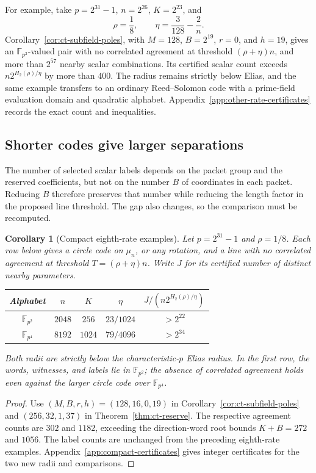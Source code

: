\documentclass[11pt,letterpaper]{article}
\newtheorem{corollary}[theorem]{Corollary}
\theoremstyle{definition}
\theoremstyle{remark}
\newcommand{\F}{\mathbb F}
\begin{document}
For example, take $p=2^{31}-1$, $n=2^{26}$, $K=2^{23}$, and
\[
 \rho=\frac18,\qquad \eta=\frac3{128}-\frac2n.
\]
Corollary~\ref{cor:ct-subfield-poles}, with $M=128$, $B=2^{19}$,
$r=0$, and $h=19$, gives an $\F_{p^2}$-valued pair with no correlated
agreement at threshold $(\rho+\eta)n$, and more than $2^{57}$ nearby
scalar combinations. Its certified scalar count exceeds
$n2^{H_2(\rho)/\eta}$ by more than $400$. The radius remains strictly
below Elias, and the same example transfers to an ordinary
Reed--Solomon code with a prime-field evaluation domain and quadratic
alphabet. Appendix~\ref{app:other-rate-certificates} records the
exact count and inequalities.

\subsection{Shorter codes give larger separations}

The number of selected scalar labels depends on the packet group and
the reserved coefficients, but not on the number $B$ of coordinates
in each packet. Reducing $B$ therefore preserves that number while
reducing the length factor in the proposed line threshold. The gap
also changes, so the comparison must be recomputed.

\begin{corollary}[Compact eighth-rate examples]
\label{cor:ct-compact-eighth}
Let $p=2^{31}-1$ and $\rho=1/8$. Each row below gives a circle code
on $\mu_n$, or any rotation, and a line with no correlated agreement
at threshold $T=(\rho+\eta)n$. Write $J$ for its certified number of
distinct nearby parameters.
\begin{center}
\begin{tabular}{ccccc}
\toprule
Alphabet & $n$ & $K$ & $\eta$ & $J/(n2^{H_2(\rho)/\eta})$\\
\midrule
$\F_{p^2}$ & $2048$ & $256$ & $23/1024$ & $>2^{22}$\\
$\F_{p^4}$ & $8192$ & $1024$ & $79/4096$ & $>2^{34}$\\
\bottomrule
\end{tabular}
\end{center}
Both radii are strictly below the characteristic-$p$ Elias radius.
In the first row, the words, witnesses, and labels lie in $\F_{p^2}$;
the absence of correlated agreement holds even against the larger
circle code over $\F_{p^4}$.
\end{corollary}
\begin{proof}
Use $(M,B,r,h)=(128,16,0,19)$ in
Corollary~\ref{cor:ct-subfield-poles} and
$(256,32,1,37)$ in Theorem~\ref{thm:ct-reserve}.
The respective agreement counts are $302$ and $1182$, exceeding
the direction-word root bounds $K+B=272$ and $1056$.
The label counts are unchanged from the preceding eighth-rate examples.
Appendix~\ref{app:compact-certificates} gives integer certificates
for the two new radii and comparisons.
\end{proof}
\end{document}
